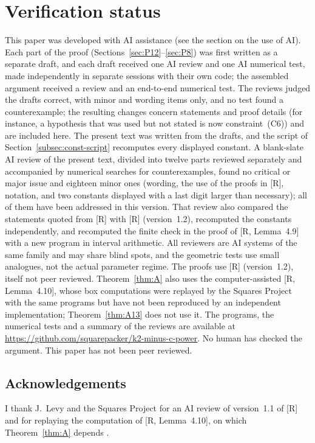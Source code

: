 \documentclass[11pt]{amsart}
\theoremstyle{definition}
\theoremstyle{remark}
\numberwithin{equation}{section}
\begin{document}
\section*{Verification status}
This paper was developed with AI assistance (see the section on the use of AI). Each part of the proof
(Sections~\ref{sec:P12}--\ref{sec:P8}) was first written as a separate draft, and each draft received one AI review and one
AI numerical test, made independently in separate sessions with their own code; the assembled argument received a review
and an end-to-end numerical test. The reviews judged the drafts correct, with minor and wording items only, and no test
found a counterexample; the resulting changes concern statements and proof details (for instance, a hypothesis that was
used but not stated is now constraint~(C6)) and are included here. The present text was written from the drafts, and the
script of Section~\ref{subsec:const-script} recomputes every displayed constant. A blank-slate AI review of the present
text, divided into twelve parts reviewed separately and accompanied by numerical searches for counterexamples, found no
critical or major issue and eighteen minor ones (wording, the use of the proofs in [R], notation, and two constants
displayed with a last digit larger than necessary); all of them have been addressed in this version. That review also
compared the statements quoted from [R] with [R] (version~1.2), recomputed the constants independently, and recomputed the
finite check in the proof of [R, Lemma~4.9] with a new program in interval arithmetic. All reviewers are AI systems of the
same family and may share blind spots, and the geometric tests use small analogues, not the actual parameter regime. The
proofs use [R] (version~1.2), itself not peer reviewed. Theorem~\ref{thm:A} also uses the computer-assisted
[R, Lemma~4.10], whose box computations were replayed by the Squares Project \cite{LevR} with the same programs but have
not been reproduced by an independent implementation; Theorem~\ref{thm:A13} does not use it. The programs, the numerical
tests and a summary of the reviews are available at \url{https://github.com/squarepacker/k2-minus-c-power}. No human has
checked the argument. This paper has not been peer reviewed.

\subsection*{Acknowledgements}
I thank J.~Levy and the Squares Project for an AI review of version~1.1 of [R] and for replaying the computation of
[R, Lemma~4.10], on which Theorem~\ref{thm:A} depends \cite{LevR}.
\end{document}
